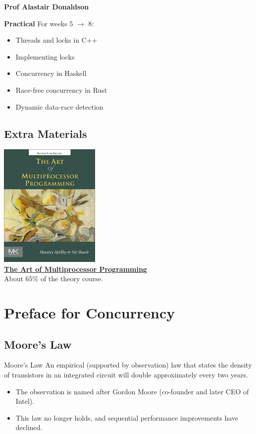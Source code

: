 {\begin{center}
\begin{tikzpicture}
		\end{tikzpicture}
		\centerline{\textbf{Prof Alastair Donaldson}}
	\end{center}
	\textbf{Practical} For weeks 5 $\to$ 8:
	\begin{itemize}
		\item Threads and locks in C++
		\item Implementing locks
		\item Concurrency in Haskell
		\item Race-free concurrency in Rust
		\item Dynamic data-race detection
	\end{itemize}
}

\subsection{Extra Materials}
\begin{center}
	\includegraphics[height=6cm]{introduction/images/the_art_of_multicore_programming.jpg}
	\\ \href{https://cs.ipm.ac.ir/asoc2016/Resources/Theartofmulticore.pdf}{\textbf{The Art of Multiprocessor Programming}}
	\\ About $65\%$ of the theory course.
\end{center}


\section{Preface for Concurrency}
\subsection{Moore's Law}
\begin{definitionbox}{Moore's Law}
	An empirical (supported by observation) law that states the density of transistors in an integrated circuit
	will double approximately every two years.
	\begin{itemize}
		\item The observation is named after Gordon Moore (co-founder and later CEO of Intel).
		\item This law no longer holds, and sequential performance improvements have declined.
	\end{itemize}
\end{definitionbox}

